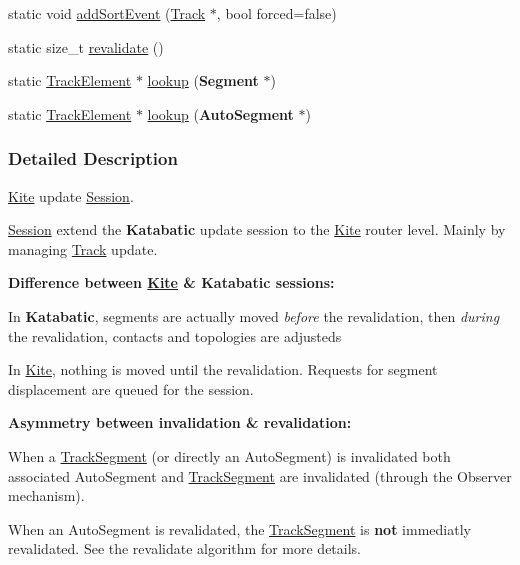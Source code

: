 \begin{DoxyCompactItemize}
\item 
static void \hyperlink{classKite_1_1Session_a990d32b1f1ea661b088a05f86319772f}{add\-Sort\-Event} (\hyperlink{classKite_1_1Track}{Track} $\ast$, bool forced=false)
\item 
static size\-\_\-t \hyperlink{classKite_1_1Session_a5bd93abe1416952ace15a98dbeeed124}{revalidate} ()
\item 
static \hyperlink{classKite_1_1TrackElement}{Track\-Element} $\ast$ \hyperlink{classKite_1_1Session_a1728621b96081c32fb7bfb18a0ebfad3}{lookup} ({\bf Segment} $\ast$)
\item 
static \hyperlink{classKite_1_1TrackElement}{Track\-Element} $\ast$ \hyperlink{classKite_1_1Session_a3946039ef19b5b6994171288f183bdaf}{lookup} ({\bf Auto\-Segment} $\ast$)
\end{DoxyCompactItemize}


\subsubsection{Detailed Description}
\hyperlink{namespaceKite}{Kite} update \hyperlink{classKite_1_1Session}{Session}. 

\hyperlink{classKite_1_1Session}{Session} extend the {\bf Katabatic} update session to the \hyperlink{namespaceKite}{Kite} router level. Mainly by managing \hyperlink{classKite_1_1Track}{Track} update.

{\bfseries Difference between \hyperlink{namespaceKite}{Kite} \& {\bf Katabatic} sessions\-:}
\begin{DoxyItemize}
\item In {\bf Katabatic}, segments are actually moved {\itshape before} the revalidation, then {\itshape during} the revalidation, contacts and topologies are adjusteds
\item In \hyperlink{namespaceKite}{Kite}, nothing is moved until the revalidation. Requests for segment displacement are queued for the session.
\end{DoxyItemize}

{\bfseries Asymmetry between invalidation \& revalidation\-:}
\begin{DoxyItemize}
\item When a \hyperlink{classKite_1_1TrackSegment}{Track\-Segment} (or directly an Auto\-Segment) is invalidated both associated Auto\-Segment and \hyperlink{classKite_1_1TrackSegment}{Track\-Segment} are invalidated (through the Observer mechanism).
\item When an Auto\-Segment is revalidated, the \hyperlink{classKite_1_1TrackSegment}{Track\-Segment} is {\bfseries not} immediatly revalidated. See the revalidate algorithm for more details.
\end{DoxyItemize}

